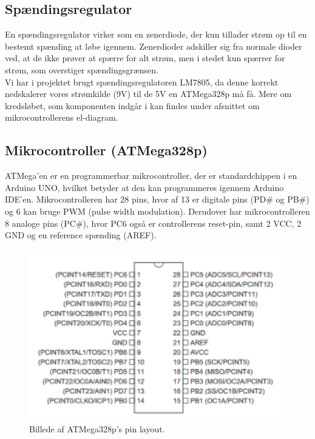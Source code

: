 \subsection{Spændingsregulator}
En spændingsregulator virker som en zenerdiode, der kun tillader strøm op til en bestemt spænding at løbe igennem. Zenerdioder adskiller sig fra normale dioder ved, at de ikke prøver at spærre for alt strøm, men i stedet kun spærrer for strøm, som overstiger spændingsgrænsen.\\

Vi har i projektet brugt spændingsregulatoren LM7805, da denne korrekt nedskalerer vores strømkilde (9V) til de 5V en ATMega328p må få. Mere om kredsløbet, som komponenten indgår i kan findes under afsnittet om mikrocontrollerens el-diagram.



\subsection{Mikrocontroller (ATMega328p)}

ATMega’en er en programmerbar mikrocontroller, der er standardchippen i en Arduino UNO, hvilket betyder at den kan programmeres igennem Arduino IDE’en. Mikrocontrolleren har 28 pins, hvor af 13 er digitale pins (PD\# og PB\#) og 6 kan bruge PWM (pulse width modulation). Derudover har mikrocontrolleren 8 analoge pins (PC\#), hvor PC6 også er controllerens reset-pin, samt 2 VCC, 2 GND og en reference spænding (AREF).\\


\begin{figure}[H]
\centering
\includegraphics[scale=0.8]{Billeder/Mikrocontroller_pins.png}
\caption{Billede af ATMega328p's pin layout.}
\label{fig:ATMega_pin}
\end{figure}

